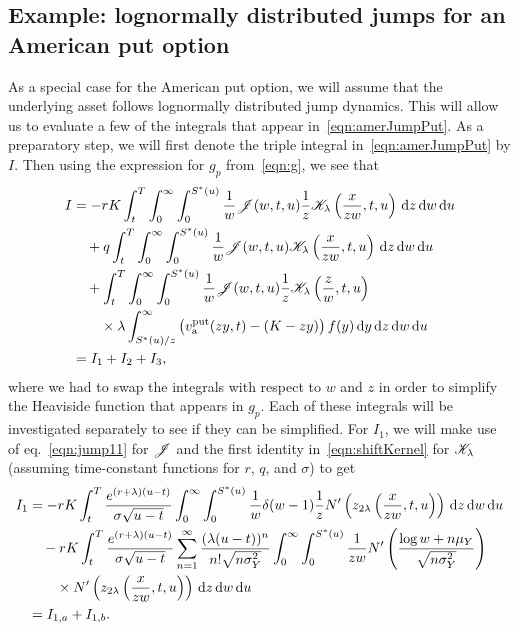         	\subsection{Example: lognormally distributed jumps for an American put option}
        	As a special case for the American put option, we will assume that the underlying asset follows lognormally distributed jump dynamics. This will allow us to evaluate a few of the integrals that appear in~\eqref{eqn:amerJumpPut}. As a preparatory step, we will first denote the triple integral in~\eqref{eqn:amerJumpPut} by $I$. Then using the expression for $g_p$ from~\eqref{eqn:g}, we see that
        	\begin{align*}
        		I &= -rK \int_t^T\int_0^\infty\int_0^{S^*(u)}\frac{1}{w}\mathscr J(w,t,u)\frac{1}{z}\mathscr K_\lambda\left( \frac{x}{zw},t,u \right) \, \mathrm d z \, \mathrm d w \, \mathrm d u \\
        		& {} \quad + q \int_t^T\int_0^\infty\int_0^{S^*(u)}\frac{1}{w}\mathscr J(w,t,u)\mathscr K_\lambda\left( \frac{x}{zw},t,u \right) \, \mathrm d z \, \mathrm d w \, \mathrm d u \\
        		& {} \quad + \int_t^T\int_0^\infty\int_0^{S^*(u)} \frac{1}{w}\mathscr J(w,t,u)\frac{1}{z}\mathscr K_\lambda\left( \frac{z}{w},t,u \right) \\
        		&{} \quad \quad \times  \lambda \int_{S^*(u)/z}^\infty \left( v_{\text{a}}^{\text{put}}(zy,t) - (K-zy) \right)f(y) \, \mathrm d y \, \mathrm d z \, \mathrm d w \, \mathrm d u \\
        		& = I_1 + I_2 + I_3,
        	\end{align*}
        	where we had to swap the integrals with respect to $w$ and $z$ in order to simplify the Heaviside function that appears in $g_p$. Each of these integrals will be investigated separately to see if they can be simplified. For $I_1$, we will make use of eq.~\eqref{eqn:jump11} for $\mathscr J$ and the first identity in~\eqref{eqn:shiftKernel} for $\mathscr K_\lambda$ (assuming time-constant functions for $r$, $q$, and $\sigma$) to get
        		\begin{align*}
        			I_1 &= -rK\int_t^T \frac{e^{(r+\lambda)(u-t)}}{\sigma\sqrt{u-t}} \int_0^\infty\int_0^{S^*(u)} \frac{1}{w} \delta(w-1) \frac{1}{z} N'\left( z_{2\lambda}\left( \frac{x}{zw}, t, u \right) \right) \, \mathrm d z \, \mathrm d w \, \mathrm d u \\
        			& {}\quad -rK\int_t^T \frac{e^{(r+\lambda)(u-t)}}{\sigma\sqrt{u-t}} \displaystyle\sum\limits_{n=1}^{\infty} \frac{(\lambda(u-t))^n}{n!\sqrt{n\sigma_Y^2}}\int_0^\infty \int_0^{S^*(u)} \frac{1}{zw}N'\left( \frac{\log w + n\mu_Y}{\sqrt{n\sigma_Y^2}} \right) \\
        			& {} \quad \quad \times N'\left( z_{2\lambda}\left( \frac{x}{zw}, t, u \right) \right) \, \mathrm d z \, \mathrm d w \, \mathrm d u \\
        			&= I_{1,a} + I_{1,b}.
        		\end{align*}
